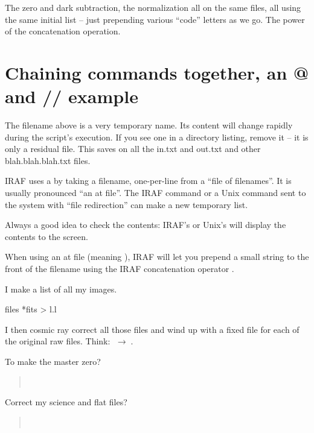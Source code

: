 \documentclass[letter,11pt,oneside]{article}
\newcommand{\menu}{\ensuremath{\;\rightarrow\;}}
\begin{document}
The zero and dark subtraction, the normalization all on the same files,
all using the same initial list -- just prepending various ``code'' letters
as we go. The power of the concatenation {\color{verbcolor}{\verb#//#}}
operation.

\section{Chaining commands together, an @ and // example}

The filename {\color{verbcolor}{\verb#l.l#}} above is a very temporary
name. Its content will change rapidly during the script's execution. If
you see one in a directory listing, remove it -- it is only a residual file.
This saves on all the in.txt and out.txt and other blah.blah.blah.txt files.

IRAF uses a {\color{verbcolor}{\verb#@filename#}} by taking a
filename, one-per-line from a ``file of filenames''. It is usually
pronounced ``an at file''. The IRAF command {\color{verbcolor}{\verb#files -1 *Bias*fits > l.l#}}
or a Unix command sent to the system
{\color{verbcolor}{\verb#!ls -1 *Bias*fits > l.l#}} with ``file redirection''
can make a new temporary list.

Always a good idea to check the contents: IRAF's
{\color{verbcolor}{\verb#type l.l#}} or Unix's
{\color{verbcolor}{\verb#cat l.l#}} will display the contents to the
screen.

When using an at file (meaning {\color{verbcolor}{\verb#@l.l#}}),
IRAF will let you prepend a small string to the front of the filename
using the IRAF concatenation operator {\color{verbcolor}{\verb#//#}}.

I make a list of all my images.

files *fits > l.l

I then cosmic ray correct all those files and wind up with a fixed
file for each of the original raw files. Think:
{\color{verbcolor}{\verb#a.fits#}} \menu {\color{verbcolor}{\verb#c_a.fits#}}.


To make the master zero?

\begin{quote}
{\color{verbcolor}{\verb#hselect c_*fits $I "(IMAGETYP == 'zero')" > l.l#}} \\
{\color{verbcolor}{\verb#imcombine @l.l zmaster.fits combine=mode#}}
\end{quote}

Correct my science and flat files?

\begin{quote}
{\color{verbcolor}{\verb#hselect c_*fits $I "(IMAGETYP == 'OBJECT' || IMAGETYP == 'flat')" > l.l#}} \\
{\color{verbcolor}{\verb#imarith @l.l - zmaster.fits z_//@l.l#}}
\end{quote}
\end{document}
